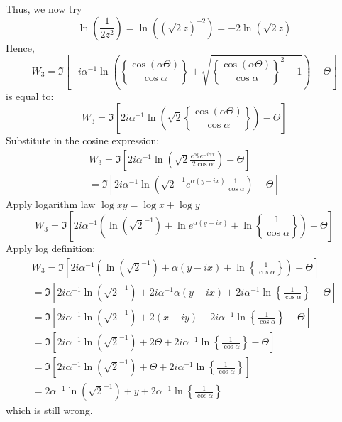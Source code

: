 \documentclass[a4paper]{report}
\begin{document}
Thus, we now try
\begin{equation}
\ln ( \frac{1}{2z^2} ) = \ln( (\sqrt{2} z )^{-2} ) = -2 \ln (\sqrt{2} z)
\end{equation}
Hence,
\begin{equation}
 W_{3} = \Im \left[  
 - i \alpha^{-1} \ln \left(
 \left\{ \frac{\cos(\alpha \Theta)}{\cos \alpha} \right\}
 + \sqrt{\left\{ \frac{\cos(\alpha \Theta)}{\cos \alpha} \right\}^{2} - 1} \right) 
  - \Theta  \right]
\end{equation}
is equal to:
\begin{equation}
 W_{3} = \Im \left[  
 2 i \alpha^{-1} \ln \left( \sqrt{2}
 \left\{ \frac{\cos(\alpha \Theta)}{\cos \alpha} \right\}
                     \right) 
  - \Theta  \right]
\end{equation}
Substitute in the cosine expression:
\begin{align}
 W_{3} = \Im \left[  
 2 i \alpha^{-1} \ln \left( \sqrt{2}
\frac{ e^{\alpha y} e^{-i\alpha x} }{2 \cos \alpha} 
                     \right) 
  - \Theta  \right]
\\
= \Im \left[  
 2 i \alpha^{-1} \ln \left( \sqrt{2}^{-1} e^{\alpha(y - ix)}
\frac{1}{\cos \alpha} 
                     \right) 
  - \Theta  \right]
\end{align}
Apply logarithm law $\log xy = \log x + \log y$
\begin{equation}
W_3 = \Im \left[  
 2 i \alpha^{-1}  \left( \ln ( \sqrt{2}^{-1}) + \ln e^{\alpha(y - ix)}
+ \ln \left\{ \frac{1}{\cos \alpha} \right\}
                     \right) 
  - \Theta  \right]
\end{equation}
Apply log definition:
\begin{align}
W_3 = \Im \left[  
 2 i \alpha^{-1}  \left( \ln ( \sqrt{2}^{-1}) + \alpha(y - ix)
+ \ln \left\{ \frac{1}{\cos \alpha} \right\}
                     \right) 
  - \Theta  \right]
\\
= \Im \left[  
 2 i \alpha^{-1} \ln ( \sqrt{2}^{-1}) + 2 i \alpha^{-1} \alpha(y - ix)
+ 2 i \alpha^{-1} \ln \left\{ \frac{1}{\cos \alpha} \right\}
  - \Theta  \right]
\\
= \Im \left[  
 2 i \alpha^{-1} \ln ( \sqrt{2}^{-1}) + 2 (x + iy)
+ 2 i \alpha^{-1} \ln \left\{ \frac{1}{\cos \alpha} \right\}
  - \Theta  \right]
\\
= \Im \left[  
 2 i \alpha^{-1} \ln ( \sqrt{2}^{-1}) + 2 \Theta
+ 2 i \alpha^{-1} \ln \left\{ \frac{1}{\cos \alpha} \right\}
  - \Theta  \right]
\\
= \Im \left[  
 2 i \alpha^{-1} \ln ( \sqrt{2}^{-1}) + \Theta
+ 2 i \alpha^{-1} \ln \left\{ \frac{1}{\cos \alpha} \right\}
\right]
\\
= 2 \alpha^{-1} \ln ( \sqrt{2}^{-1}) + y
+ 2 \alpha^{-1} \ln \left\{ \frac{1}{\cos \alpha} \right\}
\end{align}
which is still wrong.
\end{document}
